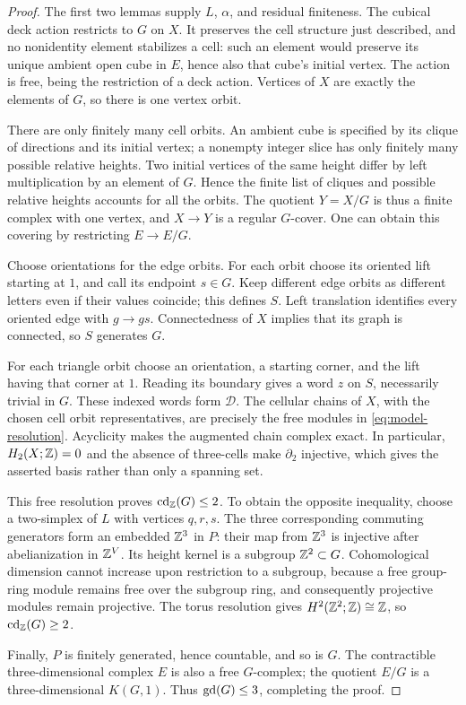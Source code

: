 \begin{proof}
The first two lemmas supply $L$, $\alpha$, and residual finiteness.
The cubical deck action restricts to $G$ on $X$.  It preserves the
cell structure just described, and no nonidentity element stabilizes
a cell: such an element would preserve its unique ambient open cube
in $E$, hence also that cube's initial vertex.  The action is free,
being the restriction of a deck action.  Vertices of $X$ are exactly
the elements of $G$, so there is one vertex orbit.

There are only finitely many cell orbits.  An ambient cube is
specified by its clique of directions and its initial vertex; a
nonempty integer slice has only finitely many possible relative
heights.  Two initial vertices of the same height differ by left
multiplication by an element of $G$.  Hence the finite list of
cliques and possible relative heights accounts for all the orbits.
The quotient $Y=X/G$ is thus a finite complex with one vertex, and
$X\to Y$ is a regular $G$-cover.  One can obtain this covering by
restricting $E\to E/G$.

Choose orientations for the edge orbits.  For each orbit choose its
oriented lift starting at $1$, and call its endpoint $s\in G$.
Keep different edge orbits as different letters even if their
values coincide; this defines $S$.  Left translation identifies
every oriented edge with $g\to gs$.  Connectedness of $X$ implies
that its graph is connected, so $S$ generates $G$.

For each triangle orbit choose an orientation, a starting corner,
and the lift having that corner at $1$.  Reading its boundary gives
a word $z$ on $S$, necessarily trivial in $G$.  These indexed words
form $\mathcal D$.  The cellular chains of $X$, with the chosen cell
orbit representatives, are precisely the free modules in
\eqref{eq:model-resolution}.  Acyclicity makes the augmented chain
complex exact.  In particular, $H_2(X;\mathbb Z)=0$ and the absence of
three-cells make $\partial_2$ injective, which gives the asserted
basis rather than only a spanning set.

This free resolution proves $\operatorname{cd}_{\mathbb Z}(G)\le2$.  To obtain the
opposite inequality, choose a two-simplex of $L$ with vertices
$q,r,s$.  The three corresponding commuting generators form an
embedded $\mathbb Z^3$ in $P$: their map from $\mathbb Z^3$ is injective after
abelianization in $\mathbb Z^V$.  Its height kernel is a subgroup
$\mathbb Z^2\subset G$.  Cohomological dimension cannot increase upon
restriction to a subgroup, because a free group-ring module remains
free over the subgroup ring, and consequently projective modules
remain projective.  The torus resolution gives
$H^2(\mathbb Z^2;\mathbb Z)\cong\mathbb Z$, so $\operatorname{cd}_{\mathbb Z}(G)\ge2$.

Finally, $P$ is finitely generated, hence countable, and so is $G$.
The contractible three-dimensional complex $E$ is also a free
$G$-complex; the quotient $E/G$ is a three-dimensional $K(G,1)$.
Thus $\operatorname{gd}(G)\le3$, completing the proof.
\end{proof}

